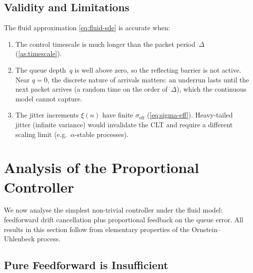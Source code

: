 \documentclass[11pt, a4paper]{article}
\theoremstyle{definition}
\theoremstyle{plain}
\theoremstyle{remark}
\begin{document}
\subsection{Validity and Limitations}\label{sec:fluid-validity}

The fluid approximation \eqref{eq:fluid-sde} is accurate when:
\begin{enumerate}[label=(\alph*)]
  \item The control timescale is much longer than the packet
    period~$\Delta$ (\cref{as:timescale}).
  \item The queue depth~$q$ is well above zero, so the reflecting
    barrier is not active.  Near $q = 0$, the discrete nature of
    arrivals matters: an underrun lasts until the next packet
    arrives (a random time on the order of~$\Delta$), which the
    continuous model cannot capture.
  \item The jitter increments $\xi(n)$ have finite
    $\sigma_{\text{eff}}$ (\cref{eq:sigma-eff}).  Heavy-tailed
    jitter (infinite variance) would invalidate the CLT and
    require a different scaling limit (e.g.\ $\alpha$-stable
    processes).
\end{enumerate}

\section{Analysis of the Proportional Controller}\label{sec:prop-analysis}

We now analyse the simplest non-trivial controller under the fluid
model: feedforward drift cancellation plus proportional feedback on the
queue error.  All results in this section follow from elementary
properties of the Ornstein--Uhlenbeck process.

\subsection{Pure Feedforward is Insufficient}\label{sec:ff-fail}
\end{document}
